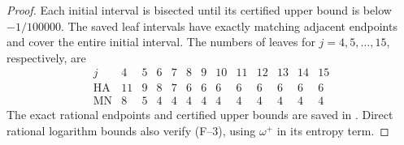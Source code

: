 \documentclass[11pt]{article}
\theoremstyle{definition}
\begin{document}
\begin{proof}
Each initial interval is bisected until its certified upper bound is
below \(-1/100000\). The saved leaf intervals have exactly matching
adjacent endpoints and cover the entire initial interval. The numbers
of leaves for \(j=4,5,\ldots,15\), respectively, are
\[
\begin{array}{c|rrrrrrrrrrrr}
j&4&5&6&7&8&9&10&11&12&13&14&15\\\hline
\text{HA}&11&9&8&7&6&6&6&6&6&6&6&6\\
\text{MN}&8&5&4&4&4&4&4&4&4&4&4&4
\end{array}
\]
The exact rational endpoints and certified upper bounds are saved in
. Direct rational logarithm bounds
also verify (F--3), using \(\omega^+\) in its entropy term.
\end{proof}
\end{document}
